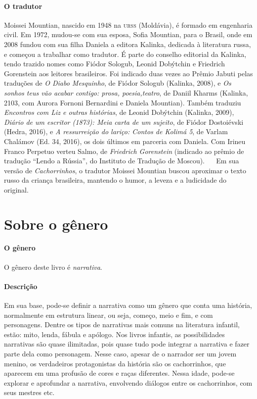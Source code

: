 \documentclass[11pt]{extarticle}
\begin{document}
\paragraph{O tradutor} 
Moissei Mountian, nascido em 1948 na \textsc{urss} (Moldávia), é formado em engenharia civil. Em 1972, mudou-se com sua esposa, Sofia Mountian, para o Brasil, onde em 2008 fundou com sua filha Daniela a editora Kalinka, dedicada à literatura russa, e começou a trabalhar como tradutor. É parte do conselho editorial da Kalinka, tendo trazido nomes como Fiódor Sologub, Leonid Dobýtchin e Friedrich Gorenstein aos leitores brasileiros. Foi indicado duas vezes ao Prêmio Jabuti pelas traduções de \textit{O Diabo Mesquinho}, de Fiódor Sologub (Kalinka, 2008), e \textit{Os sonhos teus vão acabar contigo: prosa, poesia,teatro}, de Daniil Kharms (Kalinka, 2103, com Aurora Fornoni Bernardini e Daniela Mountian). Também traduziu \textit{Encontros com Liz e outras histórias}, de Leonid Dobýtchin (Kalinka, 2009), \textit{Diário de um escritor (1873): Meia carta de um
sujeito}, de Fiódor Dostoiévski (Hedra, 2016), e \textit{A ressurreição do lariço: Contos de Kolimá 5}, de Varlam Chalámov (Ed. 34, 2016), os dois últimos em parceria com Daniela. Com Irineu Franco Perpetuo verteu Salmo, de \textit{Friedrich Gorenstein} (indicado ao prêmio de tradução “Lendo a Rússia”, do Instituto de Tradução de Moscou).
 
Em sua versão de \textit{Cachorrinhos}, o tradutor Moissei Mountian buscou aproximar o texto russo da criança
brasileira, mantendo o humor, a leveza e a ludicidade do original.

\section{Sobre o gênero}

\paragraph{O gênero} O gênero deste livro é \textit{narrativa}. 


\paragraph{Descrição} Em sua base, pode-se definir a narrativa como um gênero que conta uma história, normalmente em estrutura linear, ou seja, começo, meio e fim, e com personagens. 
Dentre os tipos de narrativas mais comuns na literatura infantil, estão: mito, lenda, 
fábula e apólogo. Nos livros infantis, as possibilidades narrativas são quase ilimitadas, pois quase tudo pode integrar a narrativa e fazer parte dela como personagem.
Nesse caso, apesar de o narrador ser um jovem menino, os verdadeiros protagonistas da história são os cachorrinhos, que aparecem em uma profusão de cores e raças diferentes.
Nessa idade, pode-se explorar e aprofundar a narrativa, envolvendo diálogos entre os cachorrinhos, com seus mestres etc.
\end{document}
